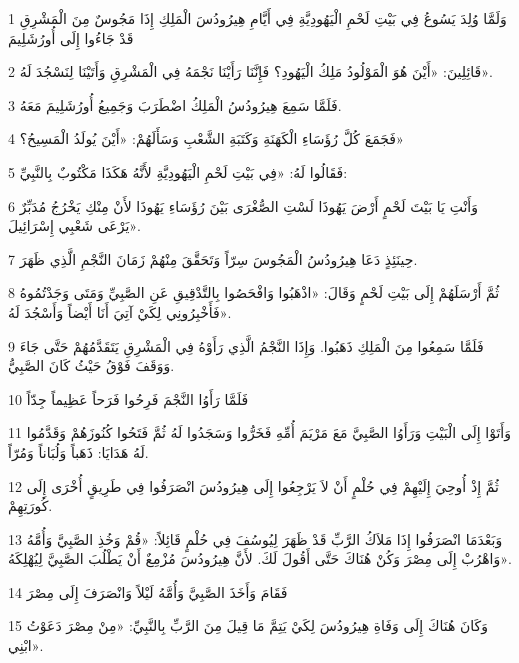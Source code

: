 \par 1 وَلَمَّا وُلِدَ يَسُوعُ فِي بَيْتِ لَحْمِ الْيَهُودِيَّةِ فِي أَيَّامِ هِيرُودُسَ الْمَلِكِ إِذَا مَجُوسٌ مِنَ الْمَشْرِقِ قَدْ جَاءُوا إِلَى أُورُشَلِيمَ
\par 2 قَائِلِينَ: «أَيْنَ هُوَ الْمَوْلُودُ مَلِكُ الْيَهُودِ؟ فَإِنَّنَا رَأَيْنَا نَجْمَهُ فِي الْمَشْرِقِ وَأَتَيْنَا لِنَسْجُدَ لَهُ».
\par 3 فَلَمَّا سَمِعَ هِيرُودُسُ الْمَلِكُ اضْطَرَبَ وَجَمِيعُ أُورُشَلِيمَ مَعَهُ.
\par 4 فَجَمَعَ كُلَّ رُؤَسَاءِ الْكَهَنَةِ وَكَتَبَةِ الشَّعْبِ وَسَأَلَهُمْ: «أَيْنَ يُولَدُ الْمَسِيحُ؟»
\par 5 فَقَالُوا لَهُ: «فِي بَيْتِ لَحْمِ الْيَهُودِيَّةِ لأَنَّهُ هَكَذَا مَكْتُوبٌ بِالنَّبِيِّ:
\par 6 وَأَنْتِ يَا بَيْتَ لَحْمٍ أَرْضَ يَهُوذَا لَسْتِ الصُّغْرَى بَيْنَ رُؤَسَاءِ يَهُوذَا لأَنْ مِنْكِ يَخْرُجُ مُدَبِّرٌ يَرْعَى شَعْبِي إِسْرَائِيلَ».
\par 7 حِينَئِذٍ دَعَا هِيرُودُسُ الْمَجُوسَ سِرّاً وَتَحَقَّقَ مِنْهُمْ زَمَانَ النَّجْمِ الَّذِي ظَهَرَ.
\par 8 ثُمَّ أَرْسَلَهُمْ إِلَى بَيْتِ لَحْمٍ وَقَالَ: «اذْهَبُوا وَافْحَصُوا بِالتَّدْقِيقِ عَنِ الصَّبِيِّ وَمَتَى وَجَدْتُمُوهُ فَأَخْبِرُونِي لِكَيْ آتِيَ أَنَا أَيْضاً وَأَسْجُدَ لَهُ».
\par 9 فَلَمَّا سَمِعُوا مِنَ الْمَلِكِ ذَهَبُوا. وَإِذَا النَّجْمُ الَّذِي رَأَوْهُ فِي الْمَشْرِقِ يَتَقَدَّمُهُمْ حَتَّى جَاءَ وَوَقَفَ فَوْقُ حَيْثُ كَانَ الصَّبِيُّ.
\par 10 فَلَمَّا رَأَوُا النَّجْمَ فَرِحُوا فَرَحاً عَظِيماً جِدّاً
\par 11 وَأَتَوْا إِلَى الْبَيْتِ وَرَأَوُا الصَّبِيَّ مَعَ مَرْيَمَ أُمِّهِ فَخَرُّوا وَسَجَدُوا لَهُ ثُمَّ فَتَحُوا كُنُوزَهُمْ وَقَدَّمُوا لَهُ هَدَايَا: ذَهَباً وَلُبَاناً وَمُرّاً.
\par 12 ثُمَّ إِذْ أُوحِيَ إِلَيْهِمْ فِي حُلْمٍ أَنْ لاَ يَرْجِعُوا إِلَى هِيرُودُسَ انْصَرَفُوا فِي طَرِيقٍ أُخْرَى إِلَى كُورَتِهِمْ.
\par 13 وَبَعْدَمَا انْصَرَفُوا إِذَا مَلاَكُ الرَّبِّ قَدْ ظَهَرَ لِيُوسُفَ فِي حُلْمٍ قَائِلاً: «قُمْ وَخُذِ الصَّبِيَّ وَأُمَّهُ وَاهْرُبْ إِلَى مِصْرَ وَكُنْ هُنَاكَ حَتَّى أَقُولَ لَكَ. لأَنَّ هِيرُودُسَ مُزْمِعٌ أَنْ يَطْلُبَ الصَّبِيَّ لِيُهْلِكَهُ».
\par 14 فَقَامَ وَأَخَذَ الصَّبِيَّ وَأُمَّهُ لَيْلاً وَانْصَرَفَ إِلَى مِصْرَ
\par 15 وَكَانَ هُنَاكَ إِلَى وَفَاةِ هِيرُودُسَ لِكَيْ يَتِمَّ مَا قِيلَ مِنَ الرَّبِّ بِالنَّبِيِّ: «مِنْ مِصْرَ دَعَوْتُ ابْنِي».
